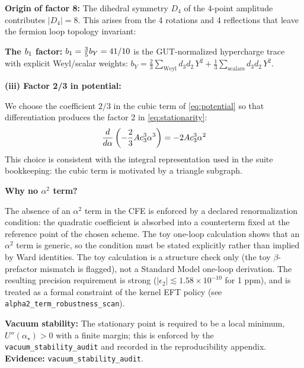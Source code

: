 \textbf{Origin of factor 8:} The dihedral symmetry $D_4$ of the 4-point amplitude 
contributes $|D_4| = 8$. This arises from the 4 rotations and 4 reflections that 
leave the fermion loop topology invariant:
\begin{center}
\end{center}

\textbf{The $b_1$ factor:} $b_1 = \frac{3}{5}b_Y = 41/10$ is the GUT-normalized
hypercharge trace with explicit Weyl/scalar weights:
$b_Y=\frac{2}{3}\sum_{\text{Weyl}} d_3 d_2\,Y^2+\frac{1}{3}\sum_{\text{scalars}} d_3 d_2\,Y^2$.

\textbf{(iii) Factor 2/3 in potential:}

We choose the coefficient $2/3$ in the cubic term of \eqref{eq:potential} so that
differentiation produces the factor 2 in \eqref{eq:stationarity}:
\begin{equation}
    \frac{d}{d\alpha}\left(-\frac{2}{3}Ac_3^3\alpha^3\right) = -2Ac_3^3\alpha^2
\end{equation}
This choice is consistent with the integral representation used in the suite
bookkeeping: the cubic term is motivated by a triangle subgraph.

\textbf{Why no $\alpha^2$ term?}

The absence of an $\alpha^2$ term in the CFE is enforced by a declared renormalization
condition: the quadratic coefficient is absorbed into a counterterm fixed at the reference
point of the chosen scheme. The toy one-loop calculation shows that an $\alpha^2$ term is
generic, so the condition must be stated explicitly rather than implied by Ward identities.
The toy calculation is a structure check only (the toy $\beta$-prefactor mismatch is flagged),
not a Standard Model one-loop derivation. The resulting precision requirement is strong
($|\epsilon_2|\lesssim 1.58\times 10^{-10}$ for 1 ppm), and is treated as a formal constraint
of the kernel EFT policy (see \texttt{alpha2\_term\_robustness\_scan}).

\textbf{Vacuum stability:} The stationary point is required to be a local minimum,
$U''(\alpha_\star)>0$ with a finite margin; this is enforced by the
\texttt{vacuum\_stability\_audit} and recorded in the reproducibility appendix.
\textbf{Evidence:} \texttt{vacuum\_stability\_audit}.

